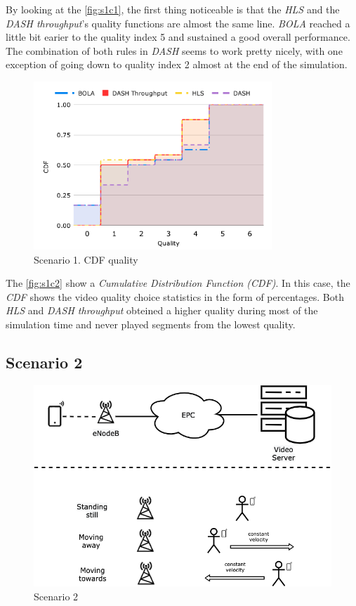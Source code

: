 By looking at the \autoref{fig:s1c1}, the first thing noticeable is that the \textit{HLS} and the \textit{DASH throughput}'s
quality functions are almost the same line. \textit{BOLA} reached a little bit earier to the quality index 5 and 
sustained a good overall performance.
The combination of both rules in \textit{DASH} seems to work pretty nicely, with one exception of going
down to quality index 2 almost at the end of the simulation. 

\begin{figure}[]
    \centering
    \includegraphics[width=0.8\textwidth]{img/s1c2.pdf}
    \caption{Scenario 1. CDF quality}
    \label{fig:s1c2}
\end{figure}

The \autoref{fig:s1c2} show a \textit{Cumulative Distribution Function (CDF)}. In this 
case, the \textit{CDF} shows the video quality choice statistics in the form of percentages. 
Both \textit{HLS} and \textit{DASH throughput} obteined a higher quality during most of 
the simulation time and never played segments from the lowest quality.

\clearpage

\subsection{Scenario 2}

\begin{figure}[h]
    \centering
    \includegraphics[width=\textwidth]{img/scenario2.png}
    \caption{Scenario 2}
    \label{fig:scenario2}
\end{figure}

